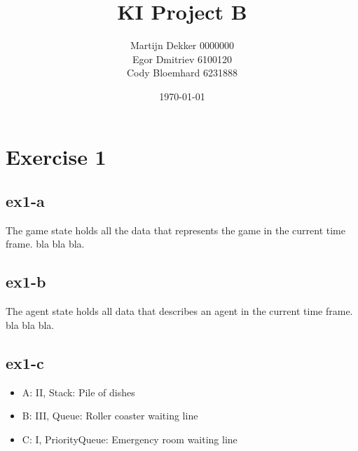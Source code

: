 \documentclass[a4paper]{article}
\title{KI Project B}
\author{
Martijn Dekker  0000000 \\
Egor Dmitriev   6100120 \\
Cody Bloemhard  6231888 \\
}
\date{\today}
\begin{document}
\maketitle

\section{Exercise 1}
\label{sec:ex1}
\subsection{ex1-a}
The game state holds all the data that represents the game in the current time frame. bla bla bla.
\subsection{ex1-b}
The agent state holds all data that describes an agent in the current time frame. bla bla bla.
\subsection{ex1-c}
\begin{itemize}
\item A: II, Stack: Pile of dishes
\item B: III, Queue: Roller coaster waiting line
\item C: I, PriorityQueue: Emergency room waiting line
\end{itemize}
\end{document}
